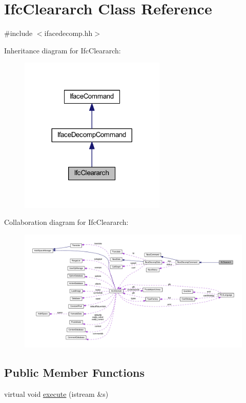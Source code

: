 \hypertarget{class_ifc_cleararch}{}\section{Ifc\+Cleararch Class Reference}
\label{class_ifc_cleararch}


{\ttfamily \#include $<$ifacedecomp.\+hh$>$}



Inheritance diagram for Ifc\+Cleararch\+:
\nopagebreak
\begin{figure}[H]
\begin{center}
\leavevmode
\includegraphics[width=197pt]{class_ifc_cleararch__inherit__graph}
\end{center}
\end{figure}


Collaboration diagram for Ifc\+Cleararch\+:
\nopagebreak
\begin{figure}[H]
\begin{center}
\leavevmode
\includegraphics[width=350pt]{class_ifc_cleararch__coll__graph}
\end{center}
\end{figure}
\subsection*{Public Member Functions}
\begin{DoxyCompactItemize}
\item 
virtual void \mbox{\hyperlink{class_ifc_cleararch_a3a74e8bd153fd7da6139b41d4bf7c90d}{execute}} (istream \&s)
\end{DoxyCompactItemize}
